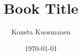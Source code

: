 \documentclass[11pt,a4paper]{book}
\title{Book Title}
\author{Konsta Kuosmanen}
\date{\today}
\begin{document}
\maketitle

\pagebreak

\tableofcontents

\pagebreak

\end{document}
